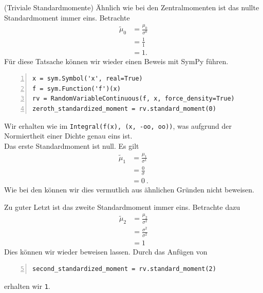 \begin{Bemerkung}{(Triviale Standardmomente)}
Ähnlich wie bei den Zentralmomenten ist das nullte Standardmoment immer eins. Betrachte
\begin{align*}
\tilde{\mu}_0 &= \frac{\mu_0}{\sigma^0}\\
&= \frac{1}{1}\\
&= 1.
\end{align*}
Für diese Tatsache können wir wieder einen \glqq Beweis\grqq{} mit SymPy führen.
\begin{lstlisting}[numbers=left, numberstyle=\tiny\color{codegray}]
x = sym.Symbol('x', real=True)
f = sym.Function('f')(x)
rv = RandomVariableContinuous(f, x, force_density=True)
zeroth_standardized_moment = rv.standard_moment(0)
\end{lstlisting}
Wir erhalten wie im \hyperlink{Bem:Zentralmomente}{} \lstinline|Integral(f(x), (x, -oo, oo))|, was aufgrund der Normiertheit einer Dichte genau eins ist.\\

Das erste Standardmoment ist null. Es gilt
\begin{align*}
\tilde{\mu}_1 &= \frac{\mu_1}{\sigma^1}\\
&= \frac{0}{\sigma}\\
&= 0~.
\end{align*}
Wie bei den \hyperlink{Bem:Zentralmomente}{} können wir dies vermutlich aus ähnlichen Gründen nicht \glqq beweisen\grqq{}.

\newpage

Zu guter Letzt ist das zweite Standardmoment immer eins. Betrachte dazu
\begin{align*}
\tilde{\mu}_2 &= \frac{\mu_2}{\sigma^2}\\
&= \frac{\sigma^2}{\sigma^2}\\
&= 1
\end{align*}
Dies können wir wieder \glqq beweisen\grqq{} lassen. Durch das Anfügen von
\begin{lstlisting}[numbers=left, numberstyle=\tiny\color{codegray}, firstnumber=5]
second_standardized_moment = rv.standard_moment(2)
\end{lstlisting}
erhalten wir \lstinline|1|.
\end{Bemerkung}

\vspace*{-\medskipamount}

